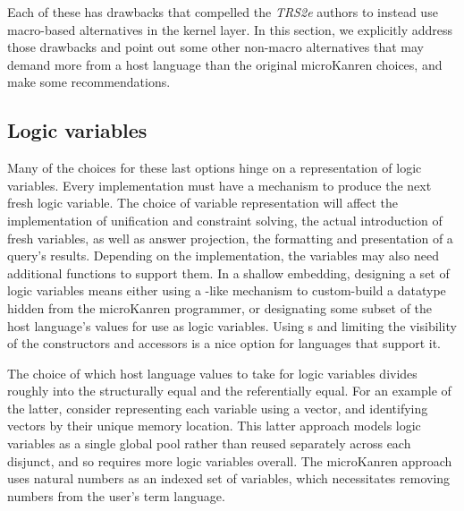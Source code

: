 \documentclass[sigplan,balance=true,pbalance=true,natbib=false]{acmart}
\begin{document}
Each of these has drawbacks that compelled the \emph{TRS2e} authors to
instead use macro-based alternatives in the kernel layer. In this
section, we explicitly address those drawbacks and point out some
other non-macro alternatives that may demand more from a host language
than the original microKanren choices, and make some recommendations.

\subsection{Logic variables}

Many of the choices for these last options hinge on a representation
of logic variables. Every implementation must have a mechanism to
produce the next fresh logic variable. The choice of variable
representation will affect the implementation of unification and
constraint solving, the actual introduction of fresh variables, as
well as answer projection, the formatting and presentation of a
query's results. Depending on the implementation, the variables may
also need additional functions to support them. In a shallow
embedding, designing a set of logic variables means either using a
-like mechanism to custom-build a datatype hidden
from the microKanren programmer, or designating some subset of the
host language's values for use as logic variables. Using
s and limiting the visibility of the constructors
and accessors is a nice option for languages that support it.

The choice of which host language values to take for logic variables
divides roughly into the structurally equal and the referentially
equal. For an example of the latter, consider representing each
variable using a vector, and identifying vectors by their unique
memory location. This latter approach models logic variables as a
single global pool rather than reused separately across each disjunct,
and so requires more logic variables overall. The microKanren approach
uses natural numbers as an indexed set of variables, which
necessitates removing numbers from the user's term language.

\subsection{}
\end{document}
